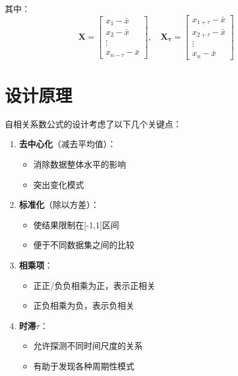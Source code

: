 \documentclass{article}
\begin{document}
其中：
\[ 
\mathbf{X} = \begin{bmatrix} 
x_1 - \bar{x} \\
x_2 - \bar{x} \\
\vdots \\
x_{n-\tau} - \bar{x}
\end{bmatrix}, \quad
\mathbf{X_\tau} = \begin{bmatrix}
x_{1+\tau} - \bar{x} \\
x_{2+\tau} - \bar{x} \\
\vdots \\
x_n - \bar{x}
\end{bmatrix}
\]

\section{设计原理}

自相关系数公式的设计考虑了以下几个关键点：

\begin{enumerate}
    \item \textbf{去中心化}（减去平均值）：
    \begin{itemize}
        \item 消除数据整体水平的影响
        \item 突出变化模式
    \end{itemize}
    
    \item \textbf{标准化}（除以方差）：
    \begin{itemize}
        \item 使结果限制在[-1,1]区间
        \item 便于不同数据集之间的比较
    \end{itemize}
    
    \item \textbf{相乘项}：
    \begin{itemize}
        \item 正正/负负相乘为正，表示正相关
        \item 正负相乘为负，表示负相关
    \end{itemize}
    
    \item \textbf{时滞$\tau$}：
    \begin{itemize}
        \item 允许探测不同时间尺度的关系
        \item 有助于发现各种周期性模式
    \end{itemize}
\end{enumerate}
\end{document}
